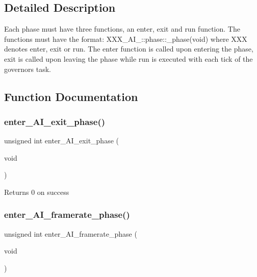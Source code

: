 \subsection{Detailed Description}
Each phase must have three functions, an enter, exit and run function. The functions must have the format\+: X\+X\+X\+\_\+\+A\+I\+\_\+\+::phase\+::\+\_\+phase(void) where X\+XX denotes enter, exit or run. The enter function is called upon entering the phase, exit is called upon leaving the phase while run is executed with each tick of the governor\textquotesingle{}s task. 

\subsection{Function Documentation}
\mbox{\label{group__phase__functions_ga31721cdeeac61d3fd2784ffa362e8c3a}} 
\subsubsection{\texorpdfstring{enter\+\_\+\+A\+I\+\_\+exit\+\_\+phase()}{enter\_AI\_exit\_phase()}}
{\footnotesize\ttfamily unsigned int enter\+\_\+\+A\+I\+\_\+exit\+\_\+phase (\begin{DoxyParamCaption}\item[{void}]{ }\end{DoxyParamCaption})}

\begin{DoxyReturn}{Returns}
0 on success 
\end{DoxyReturn}
\mbox{\label{group__phase__functions_ga90ff9fa182b94d1aae86d5fa66b3aeb0}} 
\subsubsection{\texorpdfstring{enter\+\_\+\+A\+I\+\_\+framerate\+\_\+phase()}{enter\_AI\_framerate\_phase()}}
{\footnotesize\ttfamily unsigned int enter\+\_\+\+A\+I\+\_\+framerate\+\_\+phase (\begin{DoxyParamCaption}\item[{void}]{ }\end{DoxyParamCaption})}


